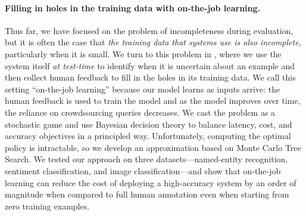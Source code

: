 \paragraph{Filling in holes in the training data with on-the-job learning.}
Thus far, we have focused on the problem of incompleteness during evaluation, but it is often the case that \textit{the training data that systems use is also incomplete}, particularly when it is small.
We turn to this problem in , where we use the system itself \textit{at test-time} to identify when it is uncertain about an example and then collect human feedback to fill in the holes in its training data.
We call this setting  ``on-the-job learning'' because our model learns as inputs arrive:
the human feedback is used to train the model and as the model improves over time, the reliance on crowdsourcing queries decreases. 
We cast the problem as a stochastic game and use Bayesian decision theory to balance latency, cost, and accuracy objectives in a principled way. 
Unfortunately, computing the optimal policy is intractable, so we develop an approximation based on Monte Carlo Tree Search.
We tested our approach on three datasets---named-entity recognition, sentiment classification, and image classification---and show that on-the-job learning can reduce the cost of deploying a high-accuracy system by an order of magnitude when compared to full human annotation even when starting from zero training examples.

